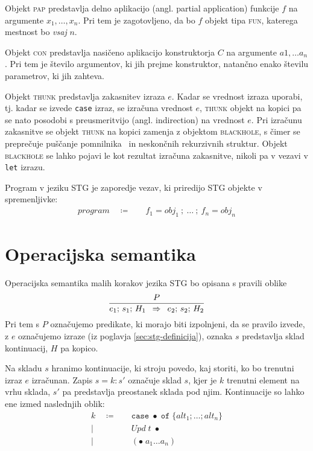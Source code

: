 Objekt \textsc{pap} predstavlja delno aplikacijo (angl. partial application) funkcije $f$ na argumente $x_1, \dots, x_n$. Pri tem je zagotovljeno, da bo $f$ objekt tipa \textsc{fun}, katerega mestnost bo \textit{vsaj} $n$.

Objekt \textsc{con} predstavlja nasičeno aplikacijo konstruktorja $C$ na argumente $a1, \dots a_n$. Pri tem je število argumentov, ki jih prejme konstruktor, natančno enako številu parametrov, ki jih zahteva.

Objekt \textsc{thunk} predstavlja zakasnitev izraza $e$. Kadar se vrednost izraza uporabi, tj. kadar se izvede \texttt{case} izraz, se izračuna vrednost $e$, \textsc{thunk} objekt na kopici pa se nato posodobi s preusmeritvijo (angl. indirection) na vrednost $e$. Pri izračunu zakasnitve se objekt \textsc{thunk} na kopici zamenja z objektom \textsc{blackhole}, s čimer se preprečuje puščanje pomnilnika~\cite{jones1992tail} in neskončnih rekurzivnih struktur. Objekt \textsc{blackhole} se lahko pojavi le kot rezultat izračuna zakasnitve, nikoli pa v vezavi v \texttt{let} izrazu.

Program v jeziku STG je zaporedje vezav, ki priredijo STG objekte v spremenljivke:
\begin{align*}
	program \quad \coloneq& \quad f_1 = obj_1 \: ; \: \dots \: ; \: f_n = obj_n
\end{align*}

\section{Operacijska semantika}
\label{sec:stg-operacijska-semantika}

Operacijska semantika malih korakov jezika STG bo opisana s pravili oblike
\begin{equation*}
\infer{P}{
    e_1; \, s_1; \, H_1
}{
    e_2; \, s_2; \, H_2
}
\end{equation*}
Pri tem s $P$ označujemo predikate, ki morajo biti izpolnjeni, da se pravilo izvede, z $e$ označujemo izraze (iz poglavja \ref{sec:stg-definicija}), oznaka $s$ predstavlja sklad kontinuacij, $H$ pa kopico.

Na skladu $s$ hranimo kontinuacije, ki stroju povedo, kaj storiti, ko bo trenutni izraz $e$ izračunan. Zapis $s = k : s'$ označuje sklad $s$, kjer je $k$ trenutni element na vrhu sklada, $s'$ pa predstavlja preostanek sklada pod njim. Kontinuacije so lahko ene izmed naslednjih oblik:
\begin{align*}
	k \quad \coloneq& \quad \texttt{case} \; \bullet \; \texttt{of} \; \{ alt_1; \dots; alt_n \}\\
	\vert& \quad \textit{Upd} \; t \; \bullet\\
	\vert& \quad (\bullet \; a_1 \dots a_n)
\end{align*}

